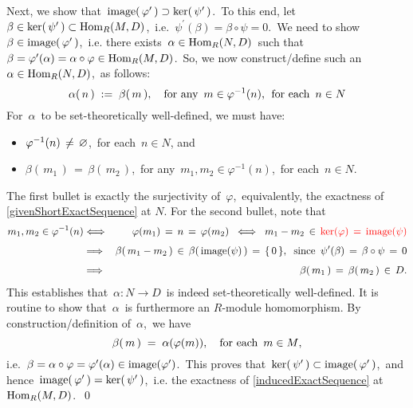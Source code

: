 \vskip 0.25cm
\noindent
Next, we show that
\,$\textnormal{image}(\,\varphi^{\prime}\,) \supset \ker(\,\psi^{\prime}\,)$.\,
To this end, let \,$\beta \in \ker(\,\psi^{\prime}\,) \subset \textnormal{Hom}_{R}(M,D)$,\,
i.e. \,$\psi^{\prime}(\beta) = \beta \circ \psi = 0$.\,
We need to show \,$\beta \in \textnormal{image}(\,\varphi^{\prime}\,)$,\,
i.e. there exists \,$\alpha \in \textnormal{Hom}_{R}(N,D)$\, such that
\,$\beta = \varphi^{\prime}(\alpha) = \alpha \circ \varphi \in \textnormal{Hom}_{R}(M,D)$.\,
So, we now construct/define such an \,$\alpha \in \textnormal{Hom}_{R}(N,D)$,\, as follows:
\begin{equation*}
\alpha(\,n\,) \; := \; \beta(\,m\,),
\quad
\textnormal{for any \,$m \in \varphi^{-1}(n)$,\; for each \,$n \in N$}
\end{equation*}
For \,$\alpha$\, to be set-theoretically well-defined, we must have:
\begin{itemize}
\item
	$\varphi^{-1}(n) \,\neq\, \varnothing$,\, for each \,$n \in N$, and
\item
	$\beta(\,m_{1}\,) \,=\, \beta(\,m_{2}\,)$,\, for any \,$m_{1}, m_{2} \in \varphi^{-1}(n)$,\, for each \,$n \in N$.	
\end{itemize}
The first bullet is exactly the {\color{red}surjectivity of \,$\varphi$},\,
equivalently, the exactness of \eqref{givenShortExactSequence} at $N$.
For the second bullet, note that
\begin{eqnarray*}
m_{1}, m_{2} \in \varphi^{-1}(n)
& \Longleftrightarrow &
	\varphi(m_{1}) \,=\, n \,=\, \varphi(m_{2})
\;\; \Longleftrightarrow \;\;
	m_{1} - m_{2} \,\in\, {\color{red}\ker(\varphi) \,=\, \image(\psi)}
\\
& \overset{{\color{white}1}}{\Longrightarrow} &
	\beta(\,m_{1} - m_{2}\,) \,\in\, \beta\!\left(\,\image(\psi)\,\right) \,=\, \{\,0\,\},
	\;\;
	\textnormal{since \,$\psi^{\prime}(\beta) \,=\, \beta \circ \psi \,=\, 0$}
\\
& \overset{{\color{white}1}}{\Longrightarrow} &
	\beta(\,m_{1}\,) \,=\, \beta(\,m_{2}\,) \,\in\, D.
\end{eqnarray*}
This establishes that \,$\alpha : N \longrightarrow D$\, is indeed set-theoretically well-defined.
It is routine to show that \,$\alpha$\, is furthermore an $R$-module homomorphism.
By construction/definition of \,$\alpha$,\, we have
\begin{equation*}
\beta(\,m\,) \; = \; \alpha(\varphi(m)),
\quad
\textnormal{for each \,$m \in M$},
\end{equation*}
i.e. \,$\beta = \alpha \circ \varphi = \varphi^{\prime}(\alpha) \in \textnormal{image}(\varphi^{\prime})$.\,
This proves that
\,$\ker(\,\psi^{\prime}\,) \subset \textnormal{image}(\,\varphi^{\prime}\,)$,\,
and hence
\,$\textnormal{image}(\,\varphi^{\prime}\,) = \ker(\,\psi^{\prime}\,)$,\,
i.e. the exactness of \eqref{inducedExactSequence} at \,$\textnormal{Hom}_{R}(M,D)$.\,
\qed

